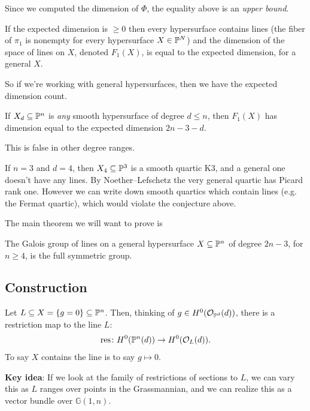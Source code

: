 \documentclass[11pt]{amsart}
\providecommand{\res}{\mathrm{res}}
\begin{document}
Since we computed the dimension of $\Phi$, the equality above is an \textit{upper bound}.

\begin{theorem} If the expected dimension is $\ge0$ then every hypersurface contains lines (the fiber of $\pi_1$ is nonempty for every hypersurface $X\in \P^N$) and the dimension of the space of lines on $X$, denoted $F_1(X)$, is equal to the expected dimension, for a general $X$.
\end{theorem}

So if we're working with general hypersurfaces, then we have the expected dimension count.

\begin{conjecture} If $X_d \subseteq \P^n$ is \textit{any} smooth hypersurface of degree $d\le n$, then $F_1(X)$ has dimension equal to the expected dimension $2n-3-d$.
\end{conjecture}

This is false in other degree ranges.

\begin{example} If $n=3$ and $d=4$, then $X_4 \subseteq \P^3$ is a smooth quartic K3, and a general one doesn't have any lines. By Noether--Lefschetz the very general quartic has Picard rank one. However we can write down smooth quartics which contain lines (e.g. the Fermat quartic), which would violate the conjecture above.
\end{example}

The main theorem we will want to prove is

\begin{theorem} The Galois group of lines on a general hypersurface $X \subseteq \P^n$ of degree $2n-3$, for $n\ge 4$, is the full symmetric group.
\end{theorem}

\subsection{Construction}

Let $L \subseteq X = \left\{ g=0 \right\} \subseteq \P^n$. Then, thinking of $g \in H^0(\O_{\P^d}(d))$, there is a restriction map to the line $L$:
\begin{align*}
    \res \colon H^0(\P^n(d)) \to H^0(\O_L(d)).
\end{align*}
To say $X$ contains the line is to say $g \mapsto 0$.

\textbf{Key idea}: If we look at the family of restrictions of sections to $L$, we can vary this as $L$ ranges over points in the Grassmannian, and we can realize this as a vector bundle over $\mathbb{G}(1,n)$.
\end{document}
